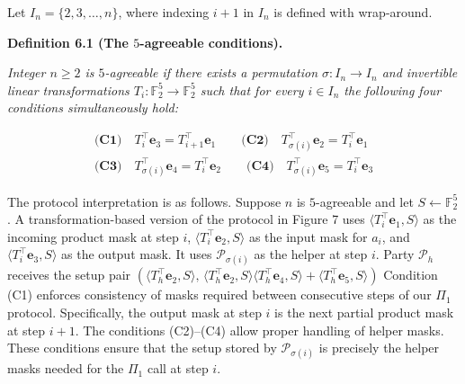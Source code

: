 \documentclass[10pt,a4paper]{article}
\begin{document}
Let $I_{n}=\{2,3,\ldots,n\}$, where indexing $i+1$ in $I_{n}$ is defined with wrap-around.\par





\par\medskip\noindent\textbf{
\textbf{Definition 6.1}\textbf{ }(The $5$-agreeable conditions)\textbf{.}
}\par



\emph{Integer $n\geq 2$ is $5$-agreeable if there exists a permutation $\sigma:I_{n}\to I_{n}$ and invertible linear transformations $T_{i}:\mathbb{F}_{2}^{5}\to\mathbb{F}_{2}^{5}$ such that for every $i\in I_{n}$ the following four conditions simultaneously hold:}\par


\[\begin{gathered}
\displaystyle\textbf{(C1)}\quad T_{i}^{\top}\mathbf{e}_{3}=T_{i+1}^{\top}\mathbf{e}_{1}\qquad\textbf{(C2)}\quad T_{\sigma(i)}^{\top}\mathbf{e}_{2}=T_{i}^{\top}\mathbf{e}_{1} \\
\displaystyle\textbf{(C3)}\quad T_{\sigma(i)}^{\top}\mathbf{e}_{4}=T_{i}^{\top}\mathbf{e}_{2}\qquad\textbf{(C4)}\quad T_{\sigma(i)}^{\top}\mathbf{e}_{5}=T_{i}^{\top}\mathbf{e}_{3}
\end{gathered}\]






The protocol interpretation is as follows. Suppose $n$ is $5$-agreeable and let $S\leftarrow\mathbb{F}_{2}^{5}$. A transformation-based version of the protocol in Figure 7 uses $\langle T_{i}^{\top}\mathbf{e}_{1},S\rangle$ as the incoming product mask at step $i$, $\langle T_{i}^{\top}\mathbf{e}_{2},S\rangle$ as the input mask for $a_{i}$, and $\langle T_{i}^{\top}\mathbf{e}_{3},S\rangle$ as the output mask. It uses $\mathcal{P}_{\sigma(i)}$ as the helper at step $i$. Party $\mathcal{P}_{h}$ receives the setup pair
$\left(\langle T_{h}^{\top}\mathbf{e}_{2},S\rangle,\,\langle T_{h}^{\top}\mathbf{e}_{2},S\rangle\langle T_{h}^{\top}\mathbf{e}_{4},S\rangle+\langle T_{h}^{\top}\mathbf{e}_{5},S\rangle\right)$
Condition (C1) enforces consistency of masks required between consecutive steps of our $\Pi_{1}$ protocol. Specifically, the
output mask at step $i$ is the next partial product mask at step $i+1$.
The conditions (C2)–(C4) allow proper handling of helper masks. These conditions ensure that the
setup stored by $\mathcal{P}_{\sigma(i)}$ is precisely the helper masks needed
for the $\Pi_{1}$ call at step $i$.\par
\end{document}
